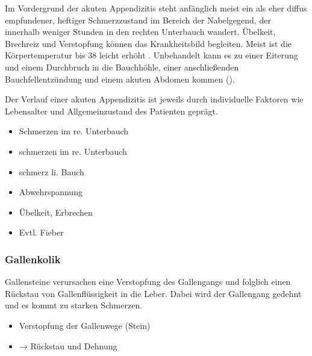 {
{%
Im Vordergrund der akuten Appendizitis
steht anfänglich meist ein als eher diffus empfundener,
heftiger Schmerzzustand im Bereich der
Nabelgegend, der
innerhalb weniger Stunden in den rechten Unterbauch
wandert. Übelkeit, Brechreiz und Verstopfung
 können
das Krankheitsbild begleiten. Meist ist die Körpertemperatur
bis 38\DegC{} leicht erhöht
. 
 Unbehandelt kann es zu einer
Eiterung und einem Durchbruch in die Bauchhöhle, einer
anschließenden Bauchfellentzündung und einem akuten Abdomen
kommen ().

Der Verlauf einer akuten Appendizitis ist jeweils durch
individuelle Faktoren wie Lebensalter und Allgemeinzustand
des Patienten geprägt.
}{
\begin{itemize}
  \item Schmerzen im re. Unterbauch
  \item {}schmerzen im re. Unterbauch
  \item {}schmerz li. Bauch
  \item Abwehrspannung
  \item Übelkeit, Erbrechen
  \item Evtl. Fieber
\end{itemize}
}{}{}{}



\subsubsection{Gallenkolik}
\label{topic:gallenkolik}



{Gallensteine verursachen eine Verstopfung des
Gallengangs und folglich einen Rückstau von
Gallenflüssigkeit in die Leber. Dabei wird der Gallengang
gedehnt und es kommt zu starken Schmerzen.} 
{
\begin{itemize}
  \item Verstopfung der Gallenwege (Stein)
  \item → Rückstau und Dehnung
\end{itemize}
}{}{}{}

}
